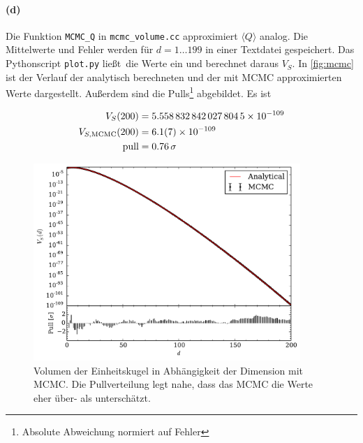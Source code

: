 \documentclass{scrartcl}
\begin{document}
\paragraph{(d)} Die Funktion \texttt{MCMC\_Q} in \texttt{mcmc\_volume.cc} approximiert $\langle Q\rangle$ analog. Die Mittelwerte und Fehler werden für $d = 1\dots199$ in einer Textdatei gespeichert. Das Pythonscript \texttt{plot.py} ließt die Werte ein und berechnet daraus $V_S$. In \autoref{fig:mcmc} ist der Verlauf der analytisch berechneten und der mit MCMC approximierten Werte dargestellt. Außerdem sind die Pulls\footnote{Absolute Abweichung normiert auf Fehler} abgebildet. Es ist

\begin{align*}
    V_{S}(200) &= \num{5.5588328420278045e-109} \\
    V_{S,\text{MCMC}}(200) &= \num{6.1 \pm 0.7e-109} \\
    \text{pull} &= \num{0.76}\,\sigma
\end{align*}

\begin{figure}[H]
    \centering
    \includegraphics[width=0.9\textwidth]{plots/plot.pdf}
    \caption{Volumen der Einheitskugel in Abhängigkeit der Dimension mit MCMC. Die Pullverteilung legt nahe, dass das MCMC die Werte eher über- als unterschätzt.}
    \label{fig:mcmc}
\end{figure}
\end{document}
